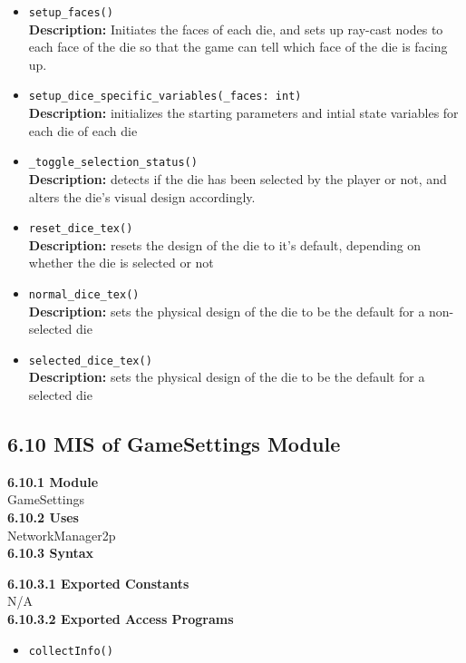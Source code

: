 \documentclass[12pt, titlepage]{article}
\begin{document}
\begin{itemize}
    \item \texttt{setup\_faces() }\\
	\textbf{Description:} Initiates the faces of each die, and sets up ray-cast nodes to each face of the die so that the game can tell which face of the die is facing up.
	\item \texttt{setup\_dice\_specific\_variables(\_faces: int) }\\
	\textbf{Description:} initializes the starting parameters and intial state variables for each die of each die 
	\item \texttt{\_toggle\_selection\_status() }\\
	\textbf{Description:} detects if the die has been selected by the player or not, and alters the die's visual design accordingly.
	\item \texttt{reset\_dice\_tex() }\\
	\textbf{Description:} resets the design of the die to it's default, depending on whether the die is selected or not
	\item \texttt{normal\_dice\_tex() }\\
	\textbf{Description:} sets the physical design of the die to be the default for a non-selected die
	\item \texttt{selected\_dice\_tex() }\\
	\textbf{Description:} sets the physical design of the die to be the default for a selected die	
	
	
\end{itemize}


\subsection*{6.10 MIS of GameSettings Module}
\textbf{6.10.1 Module}\\
 GameSettings\\

\noindent \textbf{6.10.2 Uses}\\
NetworkManager2p \\

\noindent \textbf{6.10.3 Syntax}

\noindent \textbf{6.10.3.1 Exported Constants}\\
N/A\\

\textbf{6.10.3.2 Exported Access Programs}
\begin{itemize}
	\item \texttt{collectInfo()}
	
	
\end{itemize}
\end{document}
